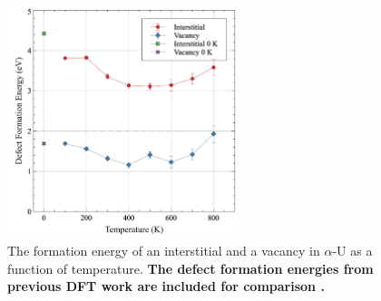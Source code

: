 \documentclass[utf8]{frontiersSCNS} %
\providecommand{\DIFaddtex}[1]{{\bf #1}} %
\providecommand{\DIFaddFL}[1]{\DIFadd{#1}} %
\providecommand{\DIFaddbeginFL}{} %
\providecommand{\DIFaddendFL}{} %
\providecommand{\DIFdelbeginFL}{} %
\providecommand{\DIFdelendFL}{} %
\providecommand{\DIFadd}[1]{\texorpdfstring{\DIFaddtex{#1}}{#1}} %
\begin{document}
 \begin{figure}[hbt]
	\centering
	\DIFdelbeginFL %
\DIFdelendFL \DIFaddbeginFL \includegraphics[width=0.6\textwidth]{defect_eform.jpg}
  \DIFaddendFL \caption{The formation energy of an interstitial and a vacancy in $\alpha$-U as a function of temperature. \DIFaddbeginFL \DIFaddFL{The defect formation energies from previous DFT work are included for comparison \cite{wirth2011}.}\DIFaddendFL }\label{fig:defs}
\end{figure}
\end{document}
